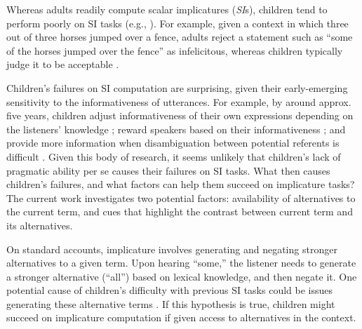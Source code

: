 \documentclass[10pt,letterpaper]{article}
\begin{document}
Whereas adults readily compute scalar implicatures (\emph{SI}s), children tend to perform poorly on SI tasks (e.g., ). For example, given a context in which three out of three horses jumped over a fence, adults reject a statement such as ``some of the horses jumped over the fence'' as infelicitous, whereas children typically judge it to be acceptable \cite{papafragou2003scalar}. 

Children's failures on SI computation are surprising, given their early-emerging sensitivity to the informativeness of utterances. For example, by around approx. five years, children adjust informativeness of their own expressions depending on the listeners' knowledge \cite{matthews2006effect}; reward speakers based on their informativeness \cite{katsos2011pragmatic}; and provide more information when disambiguation between potential referents is difficult \cite{matthews2012two}. Given this body of research, it seems unlikely that children's lack of pragmatic ability per se causes their failures on SI tasks. What then causes children's failures, and what factors can help them succeed on implicature tasks? The current work investigates two potential factors: availability of alternatives to the current term, and cues that highlight the contrast between current term and its alternatives.

On standard accounts, implicature involves generating and negating stronger alternatives to a given term. Upon hearing ``some,'' the listener needs to generate a stronger alternative (``all'') based on lexical knowledge, and then negate it. One potential cause of children's difficulty with previous SI tasks could be issues generating these alternative terms \cite{barner2011accessing}. If this hypothesis is true, children might succeed on implicature computation if given access to alternatives in the context.

\end{document}
